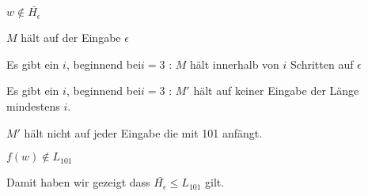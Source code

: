 \documentclass{article}
\begin{document}
$w \notin \bar{H_{\epsilon}}$ 
\begin{arrowlist} 
\item $M$ hält auf der Eingabe $\epsilon$

\item Es gibt ein $i$, beginnend bei$i = 3$ : $M$ hält innerhalb von $i$ Schritten auf $\epsilon$

\item Es gibt ein $i$, beginnend bei$i = 3$ : $M'$ hält auf keiner Eingabe der Länge mindestens $i$.

\item $M'$ hält nicht auf jeder Eingabe die mit 101 anfängt.

\item $f(w) \notin L_{101}$
\end{arrowlist}

Damit haben wir gezeigt dass $\bar{H_{\epsilon}} \leq L_{101}$ gilt.
\end{document}
